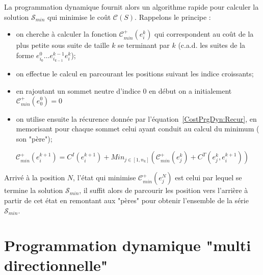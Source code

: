 La programmation dynamique fournit alors un algorithme rapide pour
calculer la solution $\mathcal S_{min} $ qui minimise le
co\^ut $ \mathcal C (S) $.
Rappelons le principe :

\begin{itemize}

\label{Def:CPlusMin}
   \item on cherche \`a calculer la fonction $ \mathcal C^+_{min} (e^k_i)$
   qui correspondent au co\^ut de la plus petite sous suite de
   taille $k$ se  terminant par $k$ (c.a.d.  les suites
   de la forme $e^0_{i_0} \dots e^{k-1}_{i_{k-1}} e^k_i$);

   \item on effectue le calcul en parcourant les positions
         suivant les indice croissants;

   \item  en rajoutant un sommet neutre d'indice $0$ en d\'ebut on a
          initialement  $ \mathcal C^+_{min} (e^0_0) = 0$

   \item on utilise ensuite la r\'ecurence donn\'ee par
         l'\'equation~\ref{CostPrgDyn:Recur}, en memorisant
         pour chaque sommet celui ayant conduit au calcul
         du minimum ( son "p\`ere");

\end{itemize}

\begin{equation}
\label{CostPrgDyn:Recur}
 \mathcal C^+_{min} (e^{k+1}_i) =  C^I(e^{k+1}_i)+Min_{j\in[1,n_k]}(
             \mathcal  C^+_{min} (e^k_j) +  C^T(e^k_j,e^{k+1}_i)
 )
\end{equation}

Arriv\'e  \`a la position $N$, l'\'etat qui minimise $\mathcal  C^+_{min} (e^N_j) $
est celui par lequel se termine  la solution $\mathcal S_{min} $, il
suffit alors de parcourir les position vers l'arri\`ere \`a partir de cet
\'etat en remontant aux "p\`eres" pour obtenir l'ensemble de  la
s\'erie $\mathcal S_{min} $.



\section{Programmation dynamique "multi directionnelle"}

